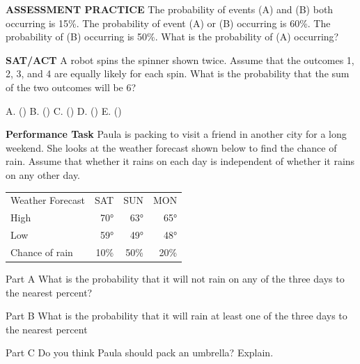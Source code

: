 \documentclass{article}
\newenvironment{practice}[2]{}{}        %
\newcommand{\answer}[1]{}               %
\newcommand{\placeholder}[2]{}          %
\begin{document}
\begin{practice}{25}{2}
\textbf{ASSESSMENT PRACTICE} The probability of events (A) and (B) both occurring is 15\%. The probability of event (A) or (B) occurring is 60\%. The probability of (B) occurring is 50\%. What is the probability of (A) occurring?
\answer{25\%}
\end{practice}
\begin{practice}{26}{1}
\textbf{SAT/ACT} A robot spins the spinner shown twice. Assume that the outcomes 1, 2, 3, and 4 are equally likely for each spin. What is the probability that the sum of the two outcomes will be 6?
\placeholder{diagram}{Four equal quadrants of circular spinner: upper-left orange 1, upper-right green 2, lower-right purple 3, lower-left blue 4. Black pointer toward upper right.}
A. ()
B. ()
C. ()
D. ()
E. ()
\answer{C}
\end{practice}
\begin{practice}{27}{3}
\textbf{Performance Task} Paula is packing to visit a friend in another city for a long weekend. She looks at the weather forecast shown below to find the chance of rain. Assume that whether it rains on each day is independent of whether it rains on any other day.
\begin{tabular}{lrrr}
Weather Forecast & SAT & SUN & MON \\
High & 70° & 63° & 65° \\
Low & 59° & 49° & 48° \\
Chance of rain & 10\% & 50\% & 20\% \\
\end{tabular}
\placeholder{illustration}{Desktop monitor displaying the three-column Weather Forecast table transcribed above. Sun and cloud icons for Saturday and Monday, sun/cloud/rain for Sunday; blue droplets beside rain percentages.}
Part A What is the probability that it will not rain on any of the three days to the nearest percent?
\answer{Part A 36\%}
Part B What is the probability that it will rain at least one of the three days to the nearest percent
\answer{Part B 64\%}
Part C Do you think Paula should pack an umbrella? Explain.
\answer{Part C Yes, because even though the chance of rain on any one day is 50\% or less, it is more likely than not to rain at some point during her visit.}
\end{practice}
\end{document}
